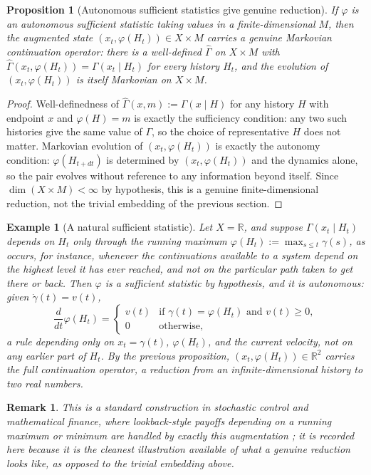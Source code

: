 \documentclass[11pt]{report}
\newtheorem{proposition}{Proposition}[chapter]
\newtheorem{remark}{Remark}[chapter]
\newtheorem{example}{Example}[chapter]
\begin{document}
\begin{proposition}[Autonomous sufficient statistics give genuine reduction]
If $\varphi$ is an autonomous sufficient statistic taking values in a
finite-dimensional $M$, then the augmented state $(x_t, \varphi(H_t)) \in
X \times M$ carries a genuine Markovian continuation operator: there is
a well-defined $\hat\Gamma$ on $X \times M$ with
$\hat\Gamma(x_t, \varphi(H_t)) = \Gamma(x_t \mid H_t)$ for every history
$H_t$, and the evolution of $(x_t, \varphi(H_t))$ is itself Markovian
on $X \times M$.
\end{proposition}
\begin{proof}
Well-definedness of $\hat\Gamma(x,m) := \Gamma(x \mid H)$ for any
history $H$ with endpoint $x$ and $\varphi(H) = m$ is exactly the
sufficiency condition: any two such histories give the same value of
$\Gamma$, so the choice of representative $H$ does not matter. Markovian
evolution of $(x_t, \varphi(H_t))$ is exactly the autonomy condition:
$\varphi(H_{t+dt})$ is determined by $(x_t, \varphi(H_t))$ and the
dynamics alone, so the pair evolves without reference to any
information beyond itself. Since $\dim(X \times M) < \infty$ by
hypothesis, this is a genuine finite-dimensional reduction, not the
trivial embedding of the previous section.
\end{proof}

\begin{example}[A natural sufficient statistic]
Let $X = \mathbb{R}$, and suppose $\Gamma(x_t \mid H_t)$ depends on
$H_t$ only through the running maximum $\varphi(H_t) := \max_{s \leq t} \gamma(s)$,
as occurs, for instance, whenever the continuations available to a
system depend on the highest level it has ever reached, and not on the
particular path taken to get there or back. Then $\varphi$ is a
sufficient statistic by hypothesis, and it is autonomous: given
$\dot\gamma(t) = v(t)$,
\[
\frac{d}{dt}\varphi(H_t) = \begin{cases} v(t) & \text{if } \gamma(t) = \varphi(H_t) \text{ and } v(t) \geq 0, \\ 0 & \text{otherwise,} \end{cases}
\]
a rule depending only on $x_t = \gamma(t)$, $\varphi(H_t)$, and the
current velocity, not on any earlier part of $H_t$. By the previous
proposition, $(x_t, \varphi(H_t)) \in \mathbb{R}^2$ carries the full
continuation operator, a reduction from an infinite-dimensional history
to two real numbers.
\end{example}

\begin{remark}
This is a standard construction in stochastic control and mathematical
finance, where lookback-style payoffs depending on a running maximum or
minimum are handled by exactly this augmentation \cite{shreve2004}; it
is recorded here because it is the cleanest illustration available of
what a genuine reduction looks like, as opposed to the trivial embedding
above.
\end{remark}
\end{document}
